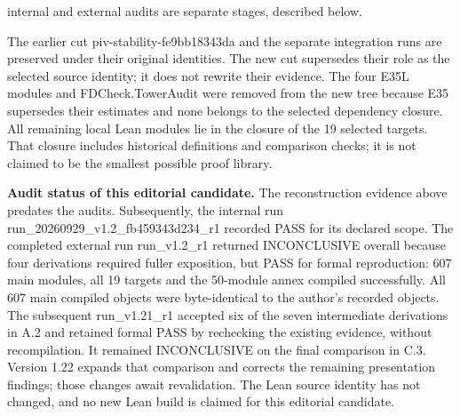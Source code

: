 \documentclass[english,11pt,a4paper]{article}
\newcounter{none}
\begin{document}
internal and external audits are separate stages, described below.

The earlier cut {\ttfamily\small piv-\discretionary{\hbox{\ensuremath{\hookrightarrow}}}{}{}stability-\discretionary{\hbox{\ensuremath{\hookrightarrow}}}{}{}fe9bb18343da} and the separate integration runs are preserved under their original identities. The new cut supersedes their role as the selected source identity; it does not rewrite their evidence. The four E35L modules and {\ttfamily\small FDCheck.\discretionary{\hbox{\ensuremath{\hookrightarrow}}}{}{}TowerAudit} were removed from the new tree because E35 supersedes their estimates and none belongs to the selected dependency closure. All remaining local Lean modules lie in the closure of the 19 selected targets. That closure includes historical definitions and comparison checks; it is not claimed to be the smallest possible proof library.

\textbf{Audit status of this editorial candidate.} The reconstruction evidence above predates the audits. Subsequently, the internal run {\ttfamily\small run\_\discretionary{\hbox{\ensuremath{\hookrightarrow}}}{}{}20260929\_\discretionary{\hbox{\ensuremath{\hookrightarrow}}}{}{}v1.\discretionary{\hbox{\ensuremath{\hookrightarrow}}}{}{}2\_\discretionary{\hbox{\ensuremath{\hookrightarrow}}}{}{}fb459343d234\discretionary{\hbox{\ensuremath{\hookrightarrow}}}{}{}\_\discretionary{\hbox{\ensuremath{\hookrightarrow}}}{}{}r1} recorded PASS for its declared scope. The completed external run {\ttfamily\small run\_\discretionary{\hbox{\ensuremath{\hookrightarrow}}}{}{}v1.\discretionary{\hbox{\ensuremath{\hookrightarrow}}}{}{}2\_\discretionary{\hbox{\ensuremath{\hookrightarrow}}}{}{}r1} returned INCONCLUSIVE overall because four derivations required fuller exposition, but PASS for formal reproduction: 607 main modules, all 19 targets and the 50-module annex compiled successfully. All 607 main compiled objects were byte-identical to the author's recorded objects. The subsequent {\ttfamily\small run\_\discretionary{\hbox{\ensuremath{\hookrightarrow}}}{}{}v1.\discretionary{\hbox{\ensuremath{\hookrightarrow}}}{}{}21\_\discretionary{\hbox{\ensuremath{\hookrightarrow}}}{}{}r1} accepted six of the seven intermediate derivations in A.2 and retained formal PASS by rechecking the existing evidence, without recompilation. It remained INCONCLUSIVE on the final comparison in C.3. Version 1.22 expands that comparison and corrects the remaining presentation findings; those changes await revalidation. The Lean source identity has not changed, and no new Lean build is claimed for this editorial candidate.
\end{document}
